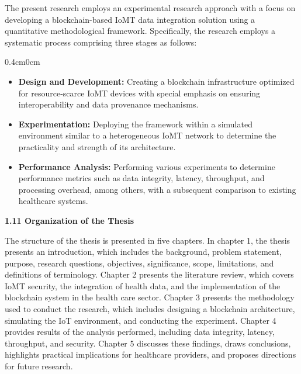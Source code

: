 \documentclass[12pt, a4paper]{report}
\begin{document}
\noindent The present research employs an experimental research approach with a focus on developing a blockchain-based IoMT data integration solution using a quantitative methodological framework. Specifically, the research employs a systematic process comprising three stages as follows:
\begin{adjustwidth} {0.4cm}{0cm}
    \vspace{-1.0em}
\begin{itemize}[nosep, topsep=0pt, partopsep=0pt]
    \item \textbf{Design and Development:} Creating a blockchain infrastructure optimized for resource-scarce IoMT devices with special emphasis on ensuring interoperability and data provenance mechanisms.
    \item \textbf{Experimentation:} Deploying the framework within a simulated environment similar to a heterogeneous IoMT network to determine the practicality and strength of its architecture.
    \item \textbf{Performance Analysis:} Performing various experiments to determine performance metrics such as data integrity, latency, throughput, and processing overhead, among others, with a subsequent comparison to existing healthcare systems.
\end{itemize}
\end{adjustwidth}


\vspace{0.5cm}

{\color{myblue} \Large \bfseries 1.11 Organization of the Thesis}

\noindent The structure of the thesis is presented in five chapters. In chapter 1, the thesis presents an introduction, which includes the background, problem statement, purpose, research questions, objectives, significance, scope, limitations, and definitions of terminology. Chapter 2 presents the literature review, which covers IoMT security, the integration of health data, and the implementation of the blockchain system in the health care sector. Chapter 3 presents the methodology used to conduct the research, which includes designing a blockchain architecture, simulating the IoT environment, and conducting the experiment. Chapter 4 provides results of the analysis performed, including data integrity, latency, throughput, and security. Chapter 5 discusses these findings, draws conclusions, highlights practical implications for healthcare providers, and proposes directions for future research.
\end{document}
